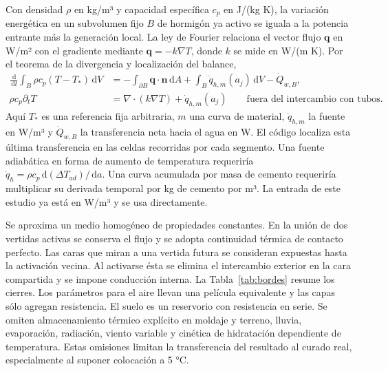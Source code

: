 \documentclass[11pt,a4paper]{article}
\newcommand{\dd}{\,\mathrm{d}}
\begin{document}
Con densidad $\rho$ en kg/m³ y capacidad específica $c_p$ en J/(kg K), la variación energética en un subvolumen fijo $B$ de hormigón ya activo se iguala a la potencia entrante más la generación local. La ley de Fourier relaciona el vector flujo $\mathbf q$ en W/m² con el gradiente mediante $\mathbf q=-k\nabla T$, donde $k$ se mide en W/(m K). Por el teorema de la divergencia y localización del balance,
\begin{align}
\frac{\dd}{\dd t}\int_B \rho c_p(T-T_*)\dd V
  &= -\int_{\partial B}\mathbf q\cdot\mathbf n\dd A
     +\int_B \dot q_{h,m}(a_j)\dd V-\dot Q_{w,B},\label{eq:inte}\\
\rho c_p\partial_t T &= \nabla\cdot(k\nabla T)+\dot q_{h,m}(a_j)
\qquad \text{fuera del intercambio con tubos}.\label{eq:pde}
\end{align}
Aquí $T_*$ es una referencia fija arbitraria, $m$ una curva de material, $\dot q_{h,m}$ la fuente en W/m³ y $\dot Q_{w,B}$ la transferencia neta hacia el agua en W. El código localiza esta última transferencia en las celdas recorridas por cada segmento. Una fuente adiabática en forma de aumento de temperatura requeriría $\dot q_h=\rho c_p\dd(\Delta T_{ad})/\dd a$. Una curva acumulada por masa de cemento requeriría multiplicar su derivada temporal por kg de cemento por m³. La entrada de este estudio ya está en W/m³ y se usa directamente.

Se aproxima un medio homogéneo de propiedades constantes. En la unión de dos vertidas activas se conserva el flujo y se adopta continuidad térmica de contacto perfecto. Las caras que miran a una vertida futura se consideran expuestas hasta la activación vecina. Al activarse ésta se elimina el intercambio exterior en la cara compartida y se impone conducción interna. La Tabla~\ref{tab:bordes} resume los cierres. Los parámetros para el aire llevan una película equivalente y las capas sólo agregan resistencia. El suelo es un reservorio con resistencia en serie. Se omiten almacenamiento térmico explícito en moldaje y terreno, lluvia, evaporación, radiación, viento variable y cinética de hidratación dependiente de temperatura. Estas omisiones limitan la transferencia del resultado al curado real, especialmente al suponer colocación a 5 °C.
\end{document}
